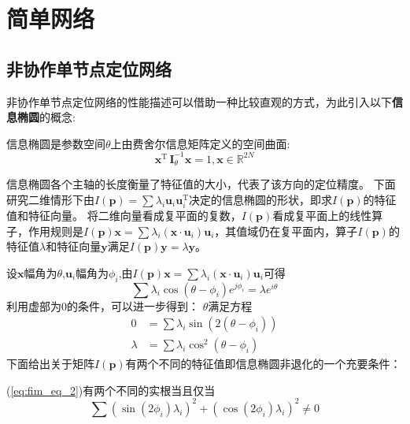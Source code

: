 \chapter{简单网络}\label{cha:content3}

\section{非协作单节点定位网络}\label{section:circle_general}
非协作单节点定位网络的性能描述可以借助一种比较直观的方式，为此引入以下\textbf{信息椭圆}的概念\cite{LimitBound}:
\begin{definition}
信息椭圆是参数空间$\theta$上由费舍尔信息矩阵定义的空间曲面:
\begin{equation}\label{eq:ie}
\bm{x}^{\textrm{T}} \,\bm{I}_{\theta}^{-1}\bm{x}=1,\bm{x}\in \mathbb{R}^{2N}
\end{equation}
\end{definition}
信息椭圆各个主轴的长度衡量了特征值的大小，代表了该方向的定位精度。
下面研究二维情形下由$I(\bm{p})=\sum \lambda_i \bm{u}_i \bm{u}_i^{\textrm{T}} $决定的信息椭圆的形状，即求$I(\bm{p})$的特征值和特征向量。
将二维向量看成复平面的复数，$I(\bm{p})$看成复平面上的线性算子，作用规则是$I(\bm{p})\bm{x}=\sum \lambda_i (\bm{x}\cdot\bm{u}_i)\bm{u}_i$，其值域仍在复平面内，算子$I(\bm{p})$的特征值$\lambda$和特征向量$\bm{y}$满足$I(\bm{p})\bm{y}=\lambda \bm{y}$。


设$\bm{x}$幅角为$\theta$,$\bm{u}_i$幅角为$\phi_i$,由$I(\bm{p})\bm{x}=\sum \lambda_i (\bm{x}\cdot\bm{u}_i)\bm{u}_i$可得
\begin{equation}
\sum \lambda_i \cos(\theta-\phi_i)e^{j\phi_i}=\lambda e^{i\theta}
\end{equation}
利用虚部为0的条件，可以进一步得到：
$\theta$满足方程
\begin{align}\label{eq:fim_eq_1}
0&=\sum \lambda_i \sin(2(\theta-\phi_i))\\
\lambda&=\sum \lambda_i \cos^2(\theta-\phi_i)\label{eq:fim_eq_2}
\end{align}
下面给出关于矩阵$I(\bm{p})$有两个不同的特征值即信息椭圆非退化的一个充要条件：
\begin{theorem}
(\ref{eq:fim_eq_2})有两个不同的实根当且仅当\[
\sum (\sin(2\phi_i)\lambda_i)^2+(\cos(2\phi_i)\lambda_i)^2 \neq 0\]
\end{theorem}


